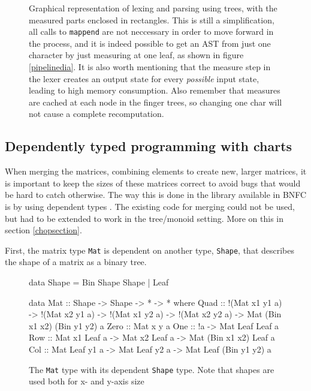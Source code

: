 \documentclass[a4paper,12pt,notitlepage]{report}
\renewcommand\cite{\citep}
\begin{document}
\begin{figure}[H]
\begin{tikzpicture}
    \end{tikzpicture}
\caption{\label{treemeasure}Graphical representation of lexing and parsing using
trees, with the measured parts enclosed in rectangles. This is still a
simplification, all calls to \texttt{mappend} are not neccessary in order to
move forward in the process, and it is indeed possible to get an AST from just
one character by just measuring at one leaf, as shown in figure
\ref{pipelinedia}. It is also worth mentioning that the measure step in the
lexer creates an output state for every \textit{possible} input state, leading
to high memory consumption. Also remember that measures are cached at each node
in the finger trees, so changing one char will not cause a complete
recomputation.}
\end{figure}

\subsection{Dependently typed programming with charts}
When merging the matrices, combining elements to create new, larger matrices, it
is important to keep the sizes of these matrices correct to avoid bugs that
would be hard to catch otherwise. The way this is done in the library available
in BNFC is by using dependent types \cite{jyp-bnfc}. The existing code for
merging could not be used, but had to be extended to work in the tree/monoid
setting. More on this in section \ref{chopsection}.

First, the matrix type \texttt{Mat} is dependent on another type,
\texttt{Shape}, that describes the shape of a matrix as a binary tree.

\begin{figure}[H]
\begin{code}
data Shape = Bin Shape Shape | Leaf

data Mat :: Shape -> Shape -> * -> * where
  Quad :: !(Mat x1 y1 a) -> !(Mat x2 y1 a) ->
          !(Mat x1 y2 a) -> !(Mat x2 y2 a) ->
          Mat (Bin x1 x2) (Bin y1 y2) a
  Zero :: Mat x y a
  One :: !a -> Mat Leaf Leaf a
  Row :: Mat x1 Leaf a -> Mat x2 Leaf a -> Mat (Bin x1 x2) Leaf a
  Col :: Mat Leaf y1 a -> Mat Leaf y2 a -> Mat Leaf (Bin y1 y2) a
\end{code}
\caption{\label{mat}The \texttt{Mat} type with its dependent \texttt{Shape}
type. Note that shapes are used both for x- and y-axis size}
\end{figure}
\end{document}
